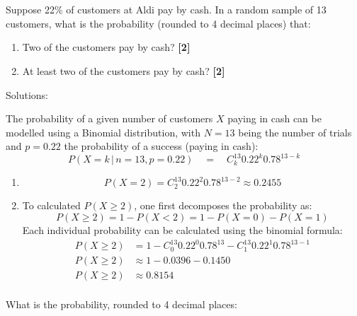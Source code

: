 \documentclass[a4paper, leqno, 12pt]{article} %
\newenvironment{top_enumerate}{
\begin{enumerate}
  \setlength{\itemsep}{2em}
  \setlength{\topsep}{-0pt}
  \setlength{\partopsep}{-0pt}
}{\end{enumerate}}
\begin{document}
\bigskip
\section*{}

\begin{top_enumerate}

\item Suppose {22}\% of customers at Aldi pay by cash. In a random sample of {13} customers, what is the probability (rounded to 4 decimal places) that:
 
\setcounter{equation}{0}  %
\begin{enumerate}
	\setlength{\topsep}{-0pt}
	\setlength{\partopsep}{-0pt}
	\setlength{\itemsep}{10pt}
			\item Two of the customers pay by cash?
	 \quad \textbf{[2]}
		\item At least two of the customers pay by cash?
	 \quad \textbf{[2]}
\end{enumerate}\addtocounter{enumi}{-1}
\item Solutions:

The probability of a given number of customers $X$ paying in cash can be modelled using a Binomial distribution, with $N={13}$ being the number of trials and $p={0.22}$ the probability of a success (paying in cash):
\[
P(X=k \, | \, n={13},p={0.22}) \quad = \quad C^{{13}}_k {0.22}^k {0.78}^{{13}-k}
\]
 
\setcounter{equation}{0}  %
\begin{enumerate}
	\setlength{\topsep}{-0pt}
	\setlength{\partopsep}{-0pt}
	\setlength{\itemsep}{10pt}
			\item \[
	P(X = 2)  = C^{{13}}_2 {0.22}^2 {0.78}^{{13}-2} \approx {0.2455}
	\]
	 \quad \textbf{}
		\item To calculated $P(X \ge 2)$, one first decomposes the probability as:
	\[
	P(X \ge 2) = 1 - P(X<2) = 1 - P(X=0) - P(X=1)
	\]
	Each individual probability can be calculated using the binomial formula:
	\[
	\begin{aligned}
	P(X \ge 2) &= 1 - C^{{13}}_0 {0.22}^0 {0.78}^{{13}} - C^{{13}}_1 {0.22}^1 {0.78}^{{13}-1}\\
	P(X \ge 2) &\approx 1 - {0.0396} - {0.1450} \\
	P(X \ge 2) &\approx {0.8154} \\
	\end{aligned}
	\]
	 \quad \textbf{}
\end{enumerate}\newpage
\item What is the probability, rounded to 4 decimal places:
 

\end{top_enumerate}
\end{document}
